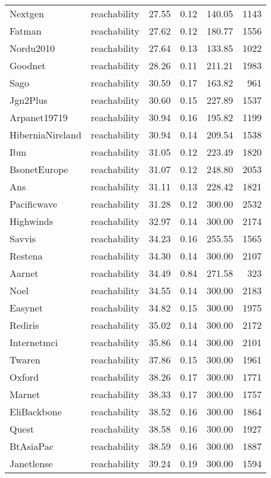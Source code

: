 \begin{tabular}{llrrrr}
Nextgen & reachability & 27.55 & 0.12 & 140.05 & 1143 \\
Fatman & reachability & 27.62 & 0.12 & 180.77 & 1556 \\
Nordu2010 & reachability & 27.64 & 0.13 & 133.85 & 1022 \\
Goodnet & reachability & 28.26 & 0.11 & 211.21 & 1983 \\
Sago & reachability & 30.59 & 0.17 & 163.82 & 961 \\
Jgn2Plus & reachability & 30.60 & 0.15 & 227.89 & 1537 \\
Arpanet19719 & reachability & 30.94 & 0.16 & 195.82 & 1199 \\
HiberniaNireland & reachability & 30.94 & 0.14 & 209.54 & 1538 \\
Ibm & reachability & 31.05 & 0.12 & 223.49 & 1820 \\
BsonetEurope & reachability & 31.07 & 0.12 & 248.80 & 2053 \\
Ans & reachability & 31.11 & 0.13 & 228.42 & 1821 \\
Pacificwave & reachability & 31.28 & 0.12 & 300.00 & 2532 \\
Highwinds & reachability & 32.97 & 0.14 & 300.00 & 2174 \\
Savvis & reachability & 34.23 & 0.16 & 255.55 & 1565 \\
Restena & reachability & 34.30 & 0.14 & 300.00 & 2107 \\
Aarnet & reachability & 34.49 & 0.84 & 271.58 & 323 \\
Noel & reachability & 34.55 & 0.14 & 300.00 & 2183 \\
Easynet & reachability & 34.82 & 0.15 & 300.00 & 1975 \\
Rediris & reachability & 35.02 & 0.14 & 300.00 & 2172 \\
Internetmci & reachability & 35.86 & 0.14 & 300.00 & 2101 \\
Twaren & reachability & 37.86 & 0.15 & 300.00 & 1961 \\
Oxford & reachability & 38.26 & 0.17 & 300.00 & 1771 \\
Marnet & reachability & 38.33 & 0.17 & 300.00 & 1757 \\
EliBackbone & reachability & 38.52 & 0.16 & 300.00 & 1864 \\
Quest & reachability & 38.58 & 0.16 & 300.00 & 1927 \\
BtAsiaPac & reachability & 38.59 & 0.16 & 300.00 & 1887 \\
Janetlense & reachability & 39.24 & 0.19 & 300.00 & 1594 \\

\end{tabular}
